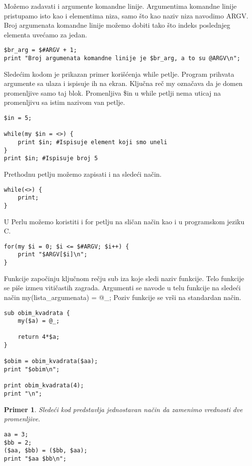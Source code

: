 \documentclass[a4paper]{article}
\newtheorem{primer}{Primer}[section]
\begin{document}
Mo\v zemo zadavati i argumente komandne linije. Argumentima komandne linije pristupamo isto kao i elementima niza, samo \v sto kao naziv niza navodimo ARGV. Broj argumenata komandne linije mo\v zemo dobiti tako \v sto indeks poslednjeg elementa uve\'camo za jedan.
\begin{lstlisting}[caption={Argumenti komandne linije}, frame=single, label=argv]
$br_arg = $#ARGV + 1;
print "Broj argumenata komandne linije je $br_arg, a to su @ARGV\n";
\end{lstlisting}
Slede\'cim kodom je prikazan primer kori\v s\'cenja while petlje. Program prihvata argumente sa ulaza i ispisuje ih na ekran. Klju\v cna re\v c my\cite{my} ozna\v cava da je domen promenljive samo taj blok. Promenljiva \$in u while petlji nema uticaj na promenljivu sa istim nazivom van petlje.
\begin{lstlisting}[caption={Unos i ispis elemenata u while petlji}, frame=single, label=while]
$in = 5;

while(my $in = <>) {
    print $in; #Ispisuje element koji smo uneli
}
print $in; #Ispisuje broj 5
\end{lstlisting}
Prethodnu petlju mo\v zemo zapisati i na slede\'ci na\v cin.
\begin{lstlisting}[caption={Unos i ispis elemenata u while petlji}, frame=single, label=while1]
while(<>) {
    print;
}
\end{lstlisting}
U Perlu mo\v zemo koristiti i for petlju na sli\v can na\v cin kao i u programskom jeziku C.
\begin{lstlisting}[caption={For petlja}, frame=single, label=for]
for(my $i = 0; $i <= $#ARGV; $i++) {
    print "$ARGV[$i]\n";
}
\end{lstlisting}
Funkcije zapo\v cinju klju\v cnom re\v cju sub iza koje sledi naziv funkcije. Telo funkcije se pi\v se izme\dj{}u viti\v castih zagrada. Argumenti se navode u telu funkcije na slede\'ci na\v cin my(lista\_argumenata) = @\_; Poziv funkcije se vr\v si na standardan na\v cin.
\begin{lstlisting}[caption={Funkcija koja ra\v cuna obim kvadrata}, frame=single, label=funkcija]
sub obim_kvadrata {
    my($a) = @_;
    
    return 4*$a;
}

$obim = obim_kvadrata($aa);
print "$obim\n"; 

print obim_kvadrata(4);
print "\n";
\end{lstlisting}

\begin{primer}
Slede\'ci kod predstavlja jednostavan na\v cin da zamenimo vrednosti dve promenljive.
\begin{lstlisting}[caption={Zamena vrednosti dve promenljive}, frame=single, label=zamena]
aa = 3;
$bb = 2;
($aa, $bb) = ($bb, $aa);
print "$aa $bb\n";

\end{lstlisting}

\end{primer}



\end{document}

